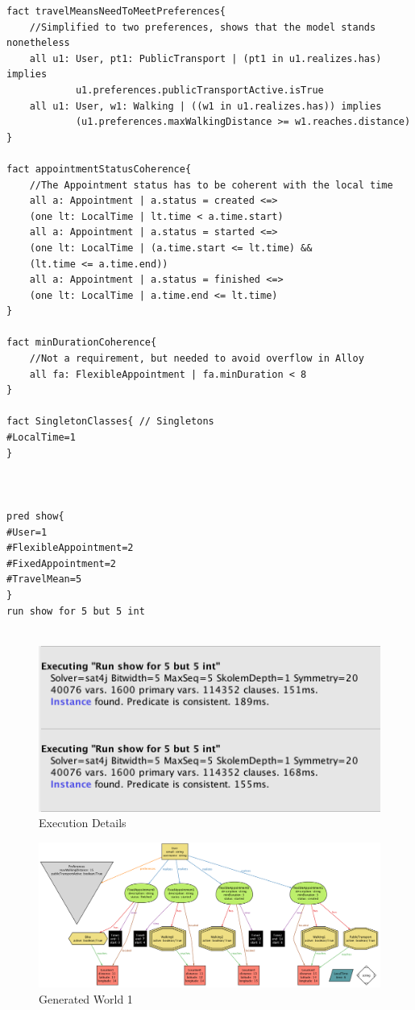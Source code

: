 \documentclass[12pt]{article}
\begin{document}
\begin{verbatim}
fact travelMeansNeedToMeetPreferences{
    //Simplified to two preferences, shows that the model stands nonetheless
    all u1: User, pt1: PublicTransport | (pt1 in u1.realizes.has) implies 
            u1.preferences.publicTransportActive.isTrue
    all u1: User, w1: Walking | ((w1 in u1.realizes.has)) implies 
            (u1.preferences.maxWalkingDistance >= w1.reaches.distance)
}

fact appointmentStatusCoherence{
    //The Appointment status has to be coherent with the local time
    all a: Appointment | a.status = created <=> 
    (one lt: LocalTime | lt.time < a.time.start)
    all a: Appointment | a.status = started <=> 
    (one lt: LocalTime | (a.time.start <= lt.time) && 
    (lt.time <= a.time.end))
    all a: Appointment | a.status = finished <=> 
    (one lt: LocalTime | a.time.end <= lt.time)
}

fact minDurationCoherence{
    //Not a requirement, but needed to avoid overflow in Alloy
    all fa: FlexibleAppointment | fa.minDuration < 8
}

fact SingletonClasses{ // Singletons
#LocalTime=1
}



pred show{
#User=1
#FlexibleAppointment=2
#FixedAppointment=2
#TravelMean=5
}
run show for 5 but 5 int


\end{verbatim}

\begin{figure}[H]
        \includegraphics[scale=0.8, origin=c]{executionDetail.png}
        \centering
        \caption{Execution Details}
    \label{fig:execDetail}
\end{figure}

\begin{figure}[H]
        \includegraphics[scale=0.46, angle=-90, origin=c]{generatedWorld1.png}
        \centering
        \caption{Generated World 1}
    \label{fig:execDetail}
\end{figure}
\end{document}
